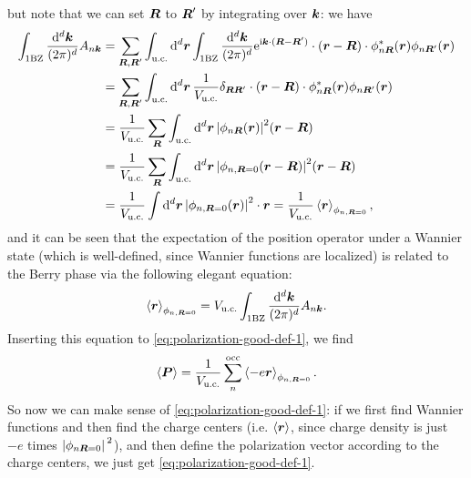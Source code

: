 \documentclass[hyperref, a4paper]{article}
\newcommand*{\ii}{\mathrm{i}}
\newcommand*{\ee}{\mathrm{e}}
\begin{document}
but note that we can set $\vb*{R}$ to $\vb*{R}'$ by integrating over $\vb*{k}$:
we have 
\begin{equation}
    \begin{aligned}
        \int_{\text{1BZ}} \frac{\dd[d]{\vb*{k}}}{(2\pi)^d} A_{n \vb*{k}} 
        &= \sum_{\vb*{R}, \vb*{R}'} \int_{\text{u.c.}} \dd[d]{\vb*{r}}
        \int_{\text{1BZ}} \frac{\dd[d]{\vb*{k}}}{(2\pi)^d} \ee^{\ii \vb*{k} \cdot (\vb*{R} - \vb*{R}')}
        \cdot (\vb*{r} - \vb*{R}) \cdot 
        \phi_{n \vb*{R}}^*(\vb*{r}) \phi_{n \vb*{R}'}(\vb*{r}) \\
        &= \sum_{\vb*{R}, \vb*{R}'} \int_{\text{u.c.}} \dd[d]{\vb*{r}}
        \frac{1}{V_{\text{u.c.}}} \delta_{\vb*{R} \vb*{R}'} 
        \cdot (\vb*{r} - \vb*{R}) \cdot 
        \phi_{n \vb*{R}}^*(\vb*{r}) \phi_{n \vb*{R}'}(\vb*{r}) \\
        &= \frac{1}{V_{\text{u.c.}}} \sum_{\vb*{R}} \int_{\text{u.c.}} \dd[d]{\vb*{r}}
        \abs{\phi_{n \vb*{R}}(\vb*{r})}^2 
        (\vb*{r} - \vb*{R}) \\
        &= \frac{1}{V_{\text{u.c.}}} \sum_{\vb*{R}} \int_{\text{u.c.}} \dd[d]{\vb*{r}}
        \abs{\phi_{n, \vb*{R} = 0}(\vb*{r} - \vb*{R})}^2 
        (\vb*{r} - \vb*{R}) \\
        &= \frac{1}{V_{\text{u.c.}}} \int \dd[d]{\vb*{r}}
        \abs{\phi_{n, \vb*{R} = 0}(\vb*{r})}^2 \cdot \vb*{r} = \frac{1}{V_{\text{u.c.}}} \expval{\vb*{r}}_{\phi_{n, \vb*{R} = 0}} ,
    \end{aligned}
\end{equation}
and it can be seen that the expectation of the position operator 
under a Wannier state (which is well-defined, since Wannier functions are localized)
is related to the Berry phase via the following elegant equation: 
\begin{equation}
    \expval{\vb*{r}}_{\phi_{n, \vb*{R} = 0}}  
    = V_{\text{u.c.}} \int_{\text{1BZ}} \frac{\dd[d]{\vb*{k}}}{(2\pi)^d} A_{n \vb*{k}} .
\end{equation}
Inserting this equation to \eqref{eq:polarization-good-def-1}, 
we find 
\begin{equation}
    \expval{\vb*{P}} = \frac{1}{V_{\text{u.c.}}} \sum_{n}^{\text{occ}} \expval{- e \vb*{r}}_{\phi_{n, \vb*{R} = 0}}.
\end{equation}
So now we can make sense of \eqref{eq:polarization-good-def-1}:
if we first find Wannier functions and then find the charge centers 
(i.e. $\expval{\vb*{r}}$, 
since charge density is just $-e$ times $\abs*{\phi_{n \vb*{R} = 0}}^2$),
and then define the polarization vector according to the charge centers, 
we just get \eqref{eq:polarization-good-def-1}.
\end{document}
